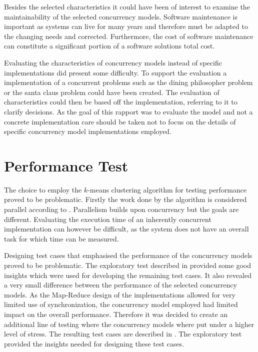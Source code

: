 Besides the selected characteristics it could have been of interest to examine the maintainability of the selected concurrency models. Software maintenance is important as systems can live for many years and therefore must be adapted to the changing needs and corrected. Furthermore, the cost of software maintenance can constitute a significant portion of a software solutions total cost\cite[p. 17]{sebestaProLang}.

Evaluating the characteristics of concurrency models instead of specific implementations did present some difficulty. To support the evaluation a implementation of a concurrent problems such as the dining philosopher problem\cite[p. 673]{hoare1978communicating} or the santa claus problem\cite{trono1994new} could have been created. The evaluation of characteristics could then be based off the implementation, referring to it to clarify decisions. As the goal of this rapport was to evaluate the model and not a concrete implementation care should be taken not to focus on the details of specific concurrency model implementations employed.

\section{Performance Test}\label{sec:reflec_perf_test}
The choice to employ the $k$-means clustering algorithm for testing performance proved to be problematic. Firstly the work done by the algorithm is considered parallel according to . Parallelism builds upon concurrency but the goals are different. Evaluating the execution time of an inherently concurrent implementation can however be difficult, as the system does not have an overall task for which time can be measured.

Designing test cases that emphasised the performance of the concurrency models proved to be problematic. The exploratory test described in  provided some good insights which were used for developing the remaining test cases. It also revealed a very small difference between the performance of the selected concurrency models. As the Map-Reduce design of the implementations allowed for very limited use of synchronization, the concurrency model employed had limited impact on the overall performance. Therefore it was decided to create an additional line of testing where the concurrency models where put under a higher level of stress. The resulting test cases are described in . The exploratory test provided the insights needed for designing these test cases.

